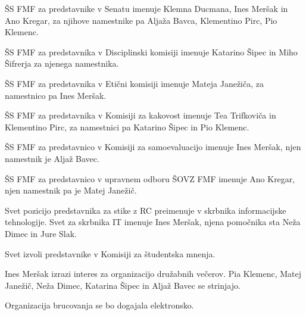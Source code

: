 \documentclass{seja}
\begin{document}
\begin{ad}
  \begin{sklep*}
    ŠS FMF za predstavnike v Senatu imenuje Klemna Ducmana, Ines Meršak in Ano Kregar, za njihove
    namestnike pa Aljaža Bavca, Klementino Pirc, Pio Klemenc.
  \end{sklep*}

  \begin{sklep*}
    ŠS FMF za predstavnika v Disciplinski komisiji imenuje Katarino Šipec in Miho Šifrerja za
    njenega namestnika.
  \end{sklep*}

  \begin{sklep*}
    ŠS FMF za predstavnika v Etični komisiji imenuje Mateja Janežiča, za namestnico pa Ines Meršak.
  \end{sklep*}

  \begin{sklep*}
    ŠS FMF za predstavnika v Komisiji za kakovost imenuje Tea Trifkoviča in Klementino Pirc, za namestnici pa Katarino Šipec in Pio Klemenc.
  \end{sklep*}

  \begin{sklep*}
    ŠS FMF za predstavnico v Komisiji za samoevaluacijo imenuje Ines Meršak, njen namestnik je Aljaž
    Bavec.
  \end{sklep*}

  \begin{sklep*}
    ŠS FMF za predstavnico v upravnem odboru ŠOVZ FMF imenuje Ano Kregar, njen namestnik pa je Matej
    Janežič.
  \end{sklep*}

  \begin{sklep*}
    Svet pozicijo predstavnika za stike z RC preimenuje v skrbnika informacijske tehnologije.
    Svet za skrbnika IT imenuje Ines Meršak, njena pomočnika sta Neža Dimec in Jure Slak.
  \end{sklep*}

  \begin{sklep*}
    Svet izvoli predstavnike v Komisiji za študentska mnenja.
  \end{sklep*}

\item
  Ines Meršak izrazi interes za organizacijo družabnih večerov.
  Pia Klemenc, Matej Janežič, Neža Dimec, Katarina Šipec in Aljaž Bavec se strinjajo.

  Organizacija brucovanja se bo dogajala elektronsko.
\end{ad}

\makeatletter \global\let\@enddocumenthook\@empty \makeatother
{}
\end{document}
